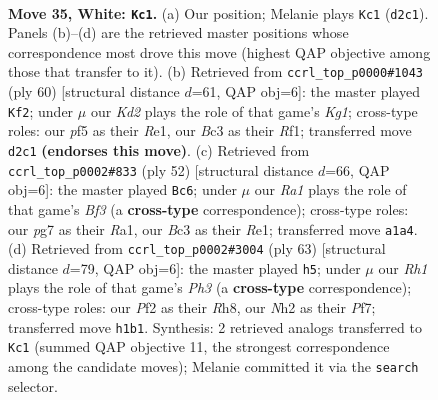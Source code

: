 \documentclass[11pt]{article}
\begin{document}
\clearpage

\begin{figure}[p]\centering
\begin{subfigure}{0.46\textwidth}\centering
\resizebox{\linewidth}{!}{%
\newchessgame
\chessboard[
  setfen={rk3b2/1p4pr/p1p1b2p/P4p2/2pP3P/2B1P3/1P1K1PPN/R6R w - - 4 35},
  showmover=false,
  pgfstyle=straightmove, color=movearrow, markmove={d2-c1}
]}
\caption{}
\end{subfigure}\hfill
\begin{subfigure}{0.46\textwidth}\centering
\resizebox{\linewidth}{!}{%
\newchessgame
\chessboard[
  setfen={3rrb2/p4p1k/1p1ppP1p/7p/P1PBP3/1P6/6PP/4RRK1 w - - 2 31},
  showmover=false,
  pgfstyle=straightmove, color=movearrow, markmove={g1-f2}
]}
\caption{}
\end{subfigure}
\\[4pt]
\begin{subfigure}{0.46\textwidth}\centering
\resizebox{\linewidth}{!}{%
\newchessgame
\chessboard[
  setfen={5rk1/2nr1ppp/1p2p3/pPb1P3/5B2/2P2B1P/2P3P1/R3R2K w - - 6 27},
  showmover=false,
  pgfstyle=straightmove, color=movearrow, markmove={f3-c6}
]}
\caption{}
\end{subfigure}\hfill
\begin{subfigure}{0.46\textwidth}\centering
\resizebox{\linewidth}{!}{%
\newchessgame
\chessboard[
  setfen={1r5r/5pk1/1b1p2pp/pBnPp3/6PP/2P2P2/1PKR4/R3B3 b - - 14 32},
  showmover=false,
  pgfstyle=straightmove, color=movearrow, markmove={h6-h5}
]}
\caption{}
\end{subfigure}
\caption{\textbf{Move 35, White: \texttt{Kc1}.} (a) Our position; Melanie plays \texttt{Kc1} (\texttt{d2c1}). Panels (b)--(d) are the retrieved master positions whose correspondence most drove this move (highest QAP objective among those that transfer to it). (b) Retrieved from \texttt{ccrl\_top\_p0000\#1043} (ply 60) [structural distance $d$=61, QAP obj=6]: the master played \texttt{Kf2}; under $\mu$ our \emph{Kd2} plays the role of that game's \emph{Kg1}; cross-type roles: our \emph{p}f5 as their \emph{R}e1, our \emph{B}c3 as their \emph{R}f1; transferred move \texttt{d2c1} \textbf{(endorses this move)}. (c) Retrieved from \texttt{ccrl\_top\_p0002\#833} (ply 52) [structural distance $d$=66, QAP obj=6]: the master played \texttt{Bc6}; under $\mu$ our \emph{Ra1} plays the role of that game's \emph{Bf3} (a \textbf{cross-type} correspondence); cross-type roles: our \emph{p}g7 as their \emph{R}a1, our \emph{B}c3 as their \emph{R}e1; transferred move \texttt{a1a4}. (d) Retrieved from \texttt{ccrl\_top\_p0002\#3004} (ply 63) [structural distance $d$=79, QAP obj=6]: the master played \texttt{h5}; under $\mu$ our \emph{Rh1} plays the role of that game's \emph{Ph3} (a \textbf{cross-type} correspondence); cross-type roles: our \emph{P}f2 as their \emph{R}h8, our \emph{N}h2 as their \emph{P}f7; transferred move \texttt{h1b1}. Synthesis: 2 retrieved analogs transferred to \texttt{Kc1} (summed QAP objective 11, the strongest correspondence among the candidate moves); Melanie committed it via the \texttt{search} selector.}
\label{fig:thought-m68}
\end{figure}
\end{document}
